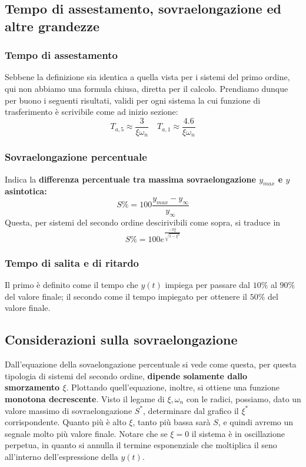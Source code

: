\subsection{Tempo di assestamento, sovraelongazione ed altre grandezze}
\begin{defin}{}{}
\subsubsection{Tempo di assestamento}
Sebbene la definizione sia identica a quella vista per i sistemi del primo ordine, qui non abbiamo una formula chiusa, diretta per il calcolo. Prendiamo dunque per buono i seguenti risultati, validi per ogni sistema la cui funzione di trasferimento  è scrivibile come ad inizio sezione:
\begin{equation}
T_{a,5} \approx \frac{3}{\xi \omega_n} \quad T_{a,1} \approx \frac{4.6}{\xi \omega_n}
\end{equation}

\subsubsection{Sovraelongazione percentuale}
Indica la \textbf{differenza percentuale tra massima sovraelongazione $y_{max}$ e $y$ asintotica:}
\begin{equation}
S\% = 100 \frac{y_{max} - y_\infty}{y_\infty}
\end{equation}
Questa, per sistemi del secondo ordine descirivibili come sopra, si traduce in 
\begin{equation}
S\% = 100 e^{\frac{-\pi \xi}{\sqrt{1-\xi^2}}}
\end{equation}
\subsubsection{Tempo di salita e di ritardo}
Il primo è definito come il tempo che $y(t)$ impiega per passare dal $10\%$ al $90\%$ del valore finale; il secondo come il tempo impiegato per ottenere il $50\%$ del valore finale.
\end{defin}
\subsection{Considerazioni sulla sovraelongazione}
Dall'equazione della sovaelongazione percentuale si vede come questa, per questa tipologia di sistemi del secondo ordine, \textbf{dipende solamente dallo smorzamento $\xi$}. 
Plottando quell'equazione, inoltre, si ottiene una funzione \textbf{monotona decrescente}. Visto il legame di $\xi, \omega_n$ con le radici, possiamo, dato un valore massimo di sovraelongazione $S^*$, determinare dal grafico il $\xi^*$ corrispondente.
\bb
Quanto più è alto $\xi$, tanto più bassa sarà $S$, e quindi avremo un segnale molto più valore finale. Notare che se $\xi = 0$ il sistema è in oscillazione perpetua, in quanto si annulla il termine esponenziale che moltiplica il seno all'interno dell'espressione della $y(t)$.

